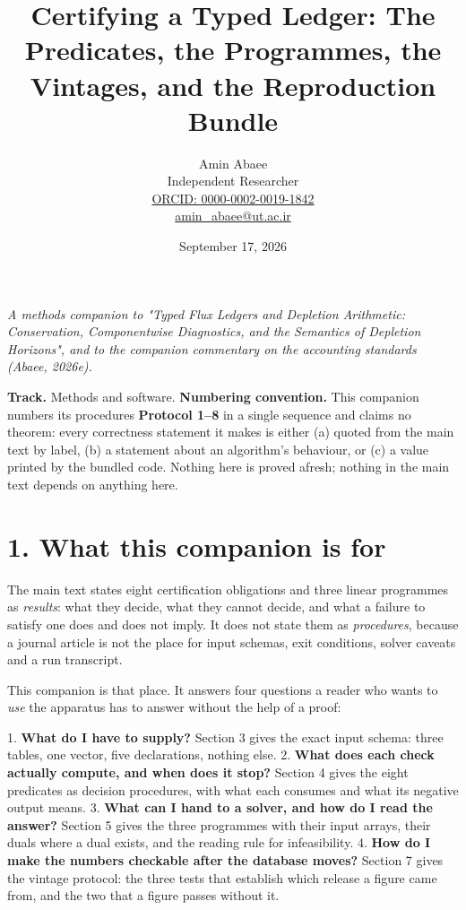 \documentclass[11pt]{article}
\begin{document}
\title{Certifying a Typed Ledger: The Predicates, the Programmes, the Vintages, and the Reproduction Bundle}
\author{Amin Abaee\\[0.35em]
{\small Independent Researcher}\\[0.55em]
{\small\href{https://orcid.org/0000-0002-0019-1842}{ORCID: 0000-0002-0019-1842}}\\[0.3em]
{\small\href{mailto:amin\_abaee@ut.ac.ir}{amin\_abaee@ut.ac.ir}}}
\date{September 17, 2026}
\maketitle

\emph{A methods companion to "Typed Flux Ledgers and Depletion Arithmetic: Conservation, Componentwise Diagnostics, and the Semantics of Depletion Horizons", and to the companion commentary on the accounting standards (Abaee, 2026e).}

\textbf{Track.} Methods and software. \textbf{Numbering convention.} This companion numbers its procedures \textbf{Protocol 1--8} in a single sequence and claims no theorem: every correctness statement it makes is either (a) quoted from the main text by label, (b) a statement about an algorithm's behaviour, or (c) a value printed by the bundled code. Nothing here is proved afresh; nothing in the main text depends on anything here.

\vspace{0.8em}

\section*{1. What this companion is for}\label{1-what-this-companion-is-for}

The main text states eight certification obligations and three linear programmes as \emph{results}: what they decide, what they cannot decide, and what a failure to satisfy one does and does not imply. It does not state them as \emph{procedures}, because a journal article is not the place for input schemas, exit conditions, solver caveats and a run transcript.

This companion is that place. It answers four questions a reader who wants to \emph{use} the apparatus has to answer without the help of a proof:

1. \textbf{What do I have to supply?} Section 3 gives the exact input schema: three tables, one vector, five declarations, nothing else. 2. \textbf{What does each check actually compute, and when does it stop?} Section 4 gives the eight predicates as decision procedures, with what each consumes and what its negative output means. 3. \textbf{What can I hand to a solver, and how do I read the answer?} Section 5 gives the three programmes with their input arrays, their duals where a dual exists, and the reading rule for infeasibility. 4. \textbf{How do I make the numbers checkable after the database moves?} Section 7 gives the vintage protocol: the three tests that establish which release a figure came from, and the two that a figure passes without it.
\end{document}
